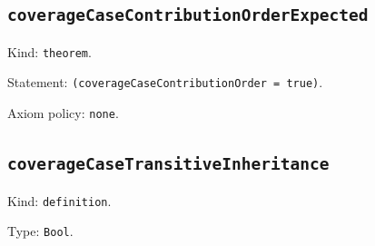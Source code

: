 \documentclass[11pt]{article}
\begin{document}
\subsection*{\texttt{coverageCaseContributionOrderExpected}}
\noindent Kind: \texttt{theorem}.\par
\noindent Statement: \texttt{(coverageCaseContributionOrder = true)}.\par
\noindent Axiom policy: \texttt{none}.\par
\subsection*{\texttt{coverageCaseTransitiveInheritance}}
\noindent Kind: \texttt{definition}.\par
\noindent Type: \texttt{Bool}.\par
\end{document}
